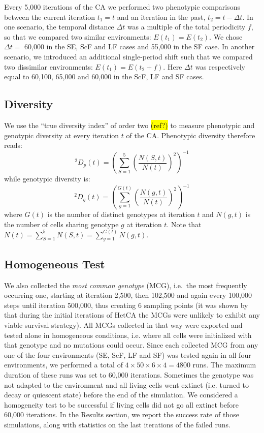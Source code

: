 Every 5,000 iterations of the CA we performed two phenotypic comparisons between the current iteration $t_1 = t$ and an iteration in the past, $t_2 = t - \Delta t$. In one scenario, the temporal distance $\Delta t$ was a multiple of the total periodicity $f$, so that we compared two similar environments: $E(t_1) = E(t_2)$. We chose $\Delta t =$ 60,000 in the SE, ScF and LF cases and 55,000 in the SF case. In another scenario, we introduced an additional single-period shift such that we compared two dissimilar environments: $E(t_1) = E(t_2 + f)$. Here $\Delta t$ was respectively equal to 60,100, 65,000 and 60,000 in the ScF, LF and SF cases.

\subsection{Diversity}
We use the ``true diversity index'' of order two \hl{(ref?)} to measure phenotypic and genotypic diversity at every iteration $t$ of the CA. Phenotypic diversity therefore reads:
%
$$^2\!D_p(t)=\left(\sum_{S=1}^5 \left(\frac{N(S,t)}{N(t)}\right)^2\right)^{-1}$$
%
while genotypic diversity is:
%
$$^2\!D_g(t)=\left(\sum_{g=1}^{G(t)} \left(\frac{N(g,t)}{N(t)}\right)^2\right)^{-1}$$
%
where $G(t)$ is the number of distinct genotypes at iteration $t$ and $N(g,t)$ is the number of cells sharing genotype $g$ at iteration $t$. Note that $N(t)=\sum_{S=1}^5 N(S,t)=\sum_{g=1}^{G(t)} N(g,t)$.

\subsection{Homogeneous Test}
We also collected the \emph{most common genotype} (MCG), i.e.~the most frequently occurring one, starting at iteration 2,500, then 102,500 and again every 100,000 steps until iteration 500,000, thus creating 6 sampling points (it was shown by \citet{medernach2015evolutionary} that during the initial iterations of HetCA the MCGs were unlikely to exhibit any viable survival strategy). All MCGs collected in that way were exported and tested alone in homogeneous conditions, i.e. where all cells were initialized with that genotype and no mutations could occur. Since each collected MCG from any one of the four environments (SE, ScF, LF and SF) was tested again in all four environments, we performed a total of $4\times50\times6\times4=4800$ runs. The maximum duration of these runs was set to 60,000 iterations. Sometimes the genotype was not adapted to the environment and all living cells went extinct (i.e. turned to decay or quiescent state) before the end of the simulation. We considered a homogeneity test to be successful if living cells did not go all extinct before 60,000 iterations. In the Results section, we report the success rate of those simulations, along with statistics on the last iterations of the failed runs. 

